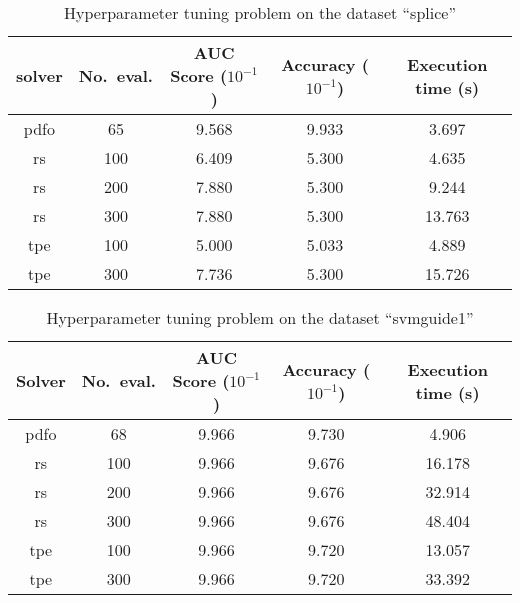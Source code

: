 \begin{table}[!ht]
    \caption{Hyperparameter tuning problem on the dataset \enquote{splice}}
    \label{tab:splice}
    \centering
    \begin{tabular}{cS[table-parse-only]SSS}
        \toprule
        solver      & {No.\ eval.}  & {AUC Score ($10^{-1}$)}   & {Accuracy ($10^{-1}$)}    & {Execution time (\si{\second})}\\
        \midrule
        \gls{pdfo}  & 65            & 9.568                     & 9.933                     & 3.697\\
        \gls{rs}    & 100           & 6.409                     & 5.300                     & 4.635\\
        \gls{rs}    & 200           & 7.880                     & 5.300                     & 9.244\\
        \gls{rs}    & 300           & 7.880                     & 5.300                     & 13.763\\
        \gls{tpe}   & 100           & 5.000                     & 5.033                     & 4.889\\
        \gls{tpe}   & 300           & 7.736                     & 5.300                     & 15.726\\
        \bottomrule
    \end{tabular}
\end{table}

\begin{table}[!ht]
    \caption{Hyperparameter tuning problem on the dataset \enquote{svmguide1}}
    \label{tab:svmguide1}
    \centering
    \begin{tabular}{cS[table-parse-only]SSS}
        \toprule
        Solver      & {No.\ eval.}  & {AUC Score ($10^{-1}$)}   & {Accuracy ($10^{-1}$)}    & {Execution time (\si{\second})}\\
        \midrule
        \gls{pdfo}  & 68            & 9.966                     & 9.730                     & 4.906\\
        \gls{rs}    & 100           & 9.966                     & 9.676                     & 16.178\\
        \gls{rs}    & 200           & 9.966                     & 9.676                     & 32.914\\
        \gls{rs}    & 300           & 9.966                     & 9.676                     & 48.404\\
        \gls{tpe}   & 100           & 9.966                     & 9.720                     & 13.057\\
        \gls{tpe}   & 300           & 9.966                     & 9.720                     & 33.392\\
        \bottomrule
    \end{tabular}
\end{table}


